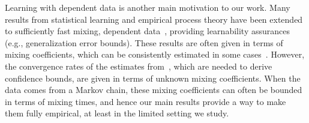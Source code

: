 Learning with dependent data is another main motivation to our work.
Many results from statistical learning and empirical process theory
have been extended to sufficiently fast mixing, dependent
data~\citep[e.g.,][]{Yu94,MR1921877,gamarnik03,MoRo08,MoRo09,DBLP:conf/nips/SteinwartC09,Steinwart2009175},
providing learnability assurances (e.g., generalization error bounds).
These results are often given in terms of mixing coefficients, which
can be consistently estimated in some cases~\citet{McDoShaSche11}.
However, the convergence rates of the estimates
from~\citet{McDoShaSche11}, which are needed to derive confidence
bounds, are given in terms of unknown mixing coefficients.
When the data comes from a Markov chain, these mixing coefficients can
often be bounded in terms of mixing times, and hence our main results
provide a way to make them fully empirical, at least in the limited setting we study.

